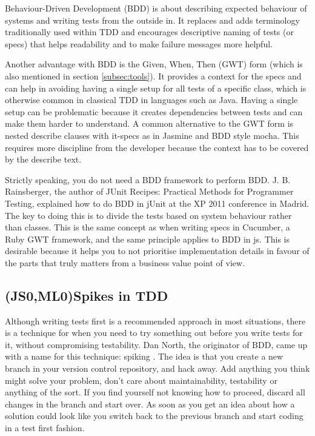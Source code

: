 \documentclass[11pt]{article}
\begin{document}
Behaviour-Driven Development (BDD) is about describing expected behaviour of systems and writing tests from the outside in. It replaces and adds terminology traditionally used within TDD and encourages descriptive naming of tests (or \glspl{spec}) that helps readability and to make failure messages more helpful. \cite[questions~17-18]{Ahnve}

Another advantage with BDD is the Given, When, Then (GWT) form (which is also mentioned in section \ref{subsec:tools}). It provides a context for the \glspl{spec} and can help in avoiding having a single setup for all tests of a specific class, which is otherwise common in classical TDD in languages such as Java. Having a single setup can be problematic because it creates dependencies between tests and can make them harder to understand. A common alternative to the GWT form is nested describe clauses with it-specs as in Jasmine and BDD style mocha. This requires more discipline from the developer because the context has to be covered by the describe text. \cite[question~19]{Ahnve}

Strictly speaking, you do not need a BDD framework to perform BDD. J. B. Rainsberger, the author of JUnit Recipes: Practical Methods for Programmer Testing, explained how to do BDD in jUnit at the XP 2011 conference in Madrid. The key to doing this is to divide the tests based on system behaviour rather than classes. This is the same concept as when writing \glspl{spec} in Cucumber, a Ruby GWT framework, and the same principle applies to BDD in \gls{js}. This is desirable because it helps you to not prioritise implementation details in favour of the parts that truly matters from a business value point of view.\cite[question~20]{Ahnve}

\subsection{(JS0,ML0)Spikes in TDD}

Although writing tests first is a recommended approach in most situations, there is a technique for when you need to try something out before you write tests for it, without compromising testability. Dan North, the originator of BDD, came up with a name for this technique: spiking \cite{TwitterDanNorth}. The idea is that you create a new branch in your version control repository, and hack away. Add anything you think might solve your problem, don't care about maintainability, testability or anything of the sort. If you find yourself not knowing how to proceed, discard all changes in the branch and start over. As soon as you get an idea about how a solution could look like you switch back to the previous branch and start coding in a test first fashion. \cite[question~59]{Edelstam}
\end{document}
